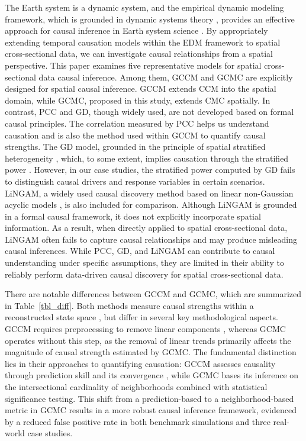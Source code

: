\documentclass[authoryear,preprint,review,12pt]{elsarticle}
\begin{document}
The Earth system is a dynamic system, and the empirical dynamic modeling framework, which is grounded in dynamic systems theory \citep{ma2017cme,leng2020pcm,tao2025cmc}, provides an effective approach for causal inference in Earth system science \citep{gao2023gccm}. By appropriately extending temporal causation models within the EDM framework to spatial cross-sectional data, we can investigate causal relationships from a spatial perspective. This paper examines five representative models for spatial cross-sectional data causal inference. Among them, GCCM and GCMC are explicitly designed for spatial causal inference. GCCM extends CCM into the spatial domain, while GCMC, proposed in this study, extends CMC spatially. In contrast, PCC and GD, though widely used, are not developed based on formal causal principles. The correlation measured by PCC helps us understand causation and is also the method used within GCCM to quantify causal strengths. The GD model, grounded in the principle of spatial stratified heterogeneity \citep{wang2010gd1,wang2016gd2,lyu2025gdverse}, which, to some extent, implies causation through the stratified power \citep{wang2024gd3}. However, in our case studies, the stratified power computed by GD fails to distinguish causal drivers and response variables in certain scenarios. LiNGAM, a widely used causal discovery method based on linear non-Gaussian acyclic models \citep{shimizu2011lingam}, is also included for comparison. Although LiNGAM is grounded in a formal causal framework, it does not explicitly incorporate spatial information. As a result, when directly applied to spatial cross-sectional data, LiNGAM often fails to capture causal relationships and may produce misleading causal inferences. While PCC, GD, and LiNGAM can contribute to causal understanding under specific assumptions, they are limited in their ability to reliably perform data-driven causal discovery for spatial cross-sectional data.

There are notable differences between GCCM and GCMC, which are summarized in Table~\ref{tbl_diff}. Both methods measure causal strengths within a reconstructed state space \citep{Takens1981embedding,Mane1981embedding,sugihara2012ccm}, but differ in several key methodological aspects. GCCM requires preprocessing to remove linear components \citep{gao2023gccm}, whereas GCMC operates without this step, as the removal of linear trends primarily affects the magnitude of causal strength estimated by GCMC. The fundamental distinction lies in their approaches to quantifying causation: GCCM assesses causality through prediction skill and its convergence \citep{sugihara2012ccm,gao2023gccm}, while GCMC bases its inference on the intersectional cardinality of neighborhoods combined with statistical significance testing. This shift from a prediction-based to a neighborhood-based metric in GCMC results in a more robust causal inference framework, evidenced by a reduced false positive rate in both benchmark simulations and three real-world case studies.
\end{document}
